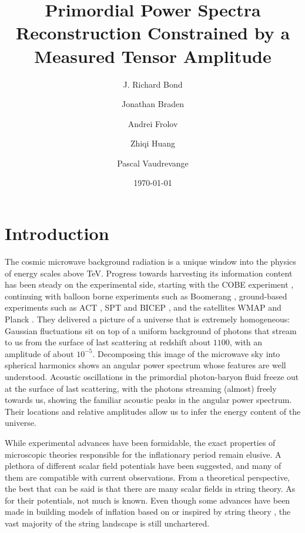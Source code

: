\documentclass[11pt]{article}
\begin{document}
\title{Primordial Power Spectra Reconstruction Constrained by a Measured Tensor Amplitude}
\author[a]{J. Richard Bond}
\author[a,b]{Jonathan Braden}
\author[c]{Andrei Frolov}
\author[a]{Zhiqi Huang}
\author[d]{Pascal Vaudrevange}



\date{\today}
\maketitle

\section{Introduction}

The cosmic microwave background radiation is a unique window into the physics of energy scales above TeV. Progress towards harvesting its information content has been steady on the experimental side, starting with the COBE experiment \cite{COBE1996}, continuing with balloon borne experiments such as Boomerang \cite{Boomerang2001, Boomerang2003}, ground-based experiments such as ACT \cite{ACT2013, ACT2014}, SPT \cite{SPT2013, SPT2014} and BICEP \cite{BICEP2}, and the satellites WMAP \cite{WMAP9Maps, WMAP9Cosmology} and Planck \cite{Planck2013Overview, Planck2013PowerSpectra, Planck2013Parameters}. They delivered a picture of a universe that is extremely homogeneous: Gaussian fluctuations sit on top of a uniform background of photons that stream to us from the surface of last scattering at redshift about $1100$, with an amplitude of about $10^{-5}$. Decomposing this image of the microwave sky into spherical harmonics shows an angular power spectrum whose features are well understood. Acoustic oscillations in the primordial photon-baryon fluid freeze out at the surface of last scattering, with the photons streaming (almost) freely towards us, showing the familiar acoustic peaks in the angular power spectrum. Their locations and relative amplitudes allow us to infer the energy content of the universe.

While experimental advances have been formidable, the exact properties of microscopic theories responsible for the inflationary period remain elusive. A plethora of different scalar field potentials have been suggested, and many of them are compatible with current observations. From a theoretical perspective, the best that can be said is that there are many scalar fields in string theory. As for their potentials, not much is known. Even though some advances have been made in building models of inflation based on or inspired by string theory \cite{KKLT, Blanco-Pillado:2004ns, Blanco-Pillado:2006he, KKLMMT, CQ, GKP, Silverstein:2008sg}, the vast majority of the string landscape is still unchartered.
\end{document}
